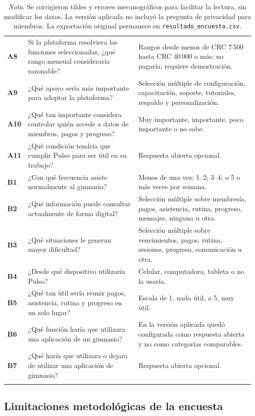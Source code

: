 \begin{longtable}{>{\bfseries}p{1.5cm}p{8cm}p{4.5cm}}
A8 & Si la plataforma resolviera las funciones seleccionadas, ¿qué rango mensual consideraría razonable? & Rangos desde menos de CRC 7\,500 hasta CRC 40\,000 o más; no pagaría; requiere demostración. \\
A9 & ¿Qué apoyo sería más importante para adoptar la plataforma? & Selección múltiple de configuración, capacitación, soporte, tutoriales, respaldo y personalización. \\
A10 & ¿Qué tan importante considera controlar quién accede a datos de miembros, pagos y progreso? & Muy importante, importante, poco importante o no sabe. \\
A11 & ¿Qué condición tendría que cumplir Pulso para ser útil en su trabajo? & Respuesta abierta opcional. \\
B1 & ¿Con qué frecuencia asiste normalmente al gimnasio? & Menos de una vez; 1--2; 3--4; o 5 o más veces por semana. \\
B2 & ¿Qué información puede consultar actualmente de forma digital? & Selección múltiple sobre membresía, pagos, asistencia, rutina, progreso, mensajes, ninguna u otra. \\
B3 & ¿Qué situaciones le generan mayor dificultad? & Selección múltiple sobre vencimientos, pagos, rutina, sesiones, progreso, comunicación u otra. \\
B4 & ¿Desde qué dispositivo utilizaría Pulso? & Celular, computadora, tableta o no la usaría. \\
B5 & ¿Qué tan útil sería reunir pagos, asistencia, rutina y progreso en un solo lugar? & Escala de 1, nada útil, a 5, muy útil. \\
B6 & ¿Qué función haría que utilizara una aplicación de un gimnasio? & En la versión aplicada quedó configurada como respuesta abierta y no como categorías comparables. \\
B7 & ¿Qué haría que utilizara o dejara de utilizar una aplicación de gimnasio? & Respuesta abierta opcional. \\
\bottomrule
\caption*{\textit{Nota}. Se corrigieron tildes y errores mecanográficos para facilitar la lectura, sin modificar los datos. La versión aplicada no incluyó la pregunta de privacidad para miembros. La exportación original permanece en \texttt{resultado\_encuesta.csv}.}
\end{longtable}

\subsection{Limitaciones metodológicas de la encuesta}

